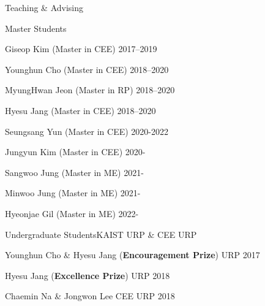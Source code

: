 \begin{rSection}{Teaching \& Advising}
\begin{rSubsection}{Master Students}{}{}{}
  \item Giseop Kim (Master in \ac{CEE}) \hfill 2017--2019
  \item Younghun Cho (Master in \ac{CEE}) \hfill 2018--2020
  \item MyungHwan Jeon (Master in \ac{RP}) \hfill 2018--2020
  \item Hyesu Jang (Master in \ac{CEE}) \hfill 2018--2020
  \item Seungsang Yun (Master in \ac{CEE}) \hfill 2020-2022
  \item Jungyun Kim (Master in \ac{CEE}) \hfill 2020-
  \item Sangwoo Jung (Master in \ac{ME}) \hfill 2021-
  \item Minwoo Jung (Master in \ac{ME}) \hfill 2021-
  \item Hyeonjae Gil (Master in \ac{ME}) \hfill 2022-
\end{rSubsection}

\begin{rSubsection}{Undergraduate Students}{}{KAIST \acf{URP} \& CEE URP}{}
  \item Younghun Cho \& Hyesu Jang ({\bf Encouragement Prize}) \hfill URP 2017
  \item Hyesu Jang ({\bf Excellence Prize}) \hfill URP 2018
  \item Chaemin Na \& Jongwon Lee \hfill CEE URP 2018
\end{rSubsection}


\end{rSection}
